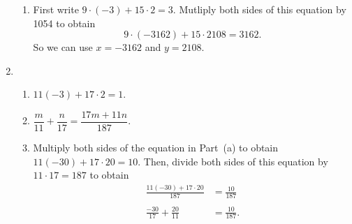 \begin{enumerate}
\begin{enumerate}
\item First write $9 \cdot (-3) + 15 \cdot 2 = 3$.  Mutliply both sides of this equation by 1054 to obtain
\[
9 \cdot (-3162) + 15 \cdot 2108 = 3162.
\]
So we can use $x = -3162$ and $y = 2108$.
\end{enumerate}




\item \begin{enumerate}
\item $11 \left( -3 \right) + 17 \cdot 2 = 1$.

\item $\dfrac{m}{11} + \dfrac{n}{17} = \dfrac{17m + 11n}{187}$.

\item Multiply both sides of the equation in Part~(a) to obtain \\
$11 \left( -30 \right) + 17 \cdot 20 = 10$.  Then, divide both sides of this equation by 
$11 \cdot 17 = 187$ to obtain
\[
\begin{aligned}
\frac{11 \left( -30 \right) + 17 \cdot 20}{187} &= \frac{10}{187} \\
                                                & \\
                 \frac{-30}{17} + \frac{20}{11} &= \frac{10}{187}. \\
\end{aligned}
\]
\end{enumerate}

\end{enumerate}
\hbreak
\endinput
